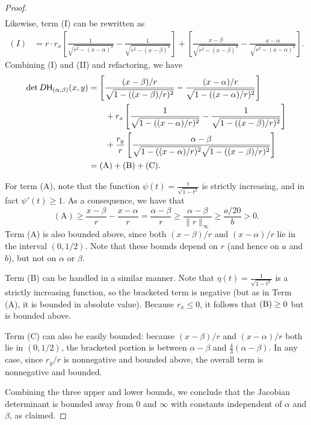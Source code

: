 \documentclass[10pt,a4paper]{amsart}
\begin{document}
\begin{proof}
\begin{align*}
    \end{align*}
    Likewise, term (I) can be rewritten as
    \begin{align*}
        (I) &= r \cdot r_x \left[\frac{1}{\sqrt{r^2 - (x - \alpha)^2}} - \frac{1}{\sqrt{r^2 - (x - \beta)^2}}\right] + \left[\frac{x - \beta}{\sqrt{r^2 - (x - \beta)^2}} - \frac{x - \alpha}{\sqrt{r^2 - (x - \alpha)^2}}\right].
    \end{align*}
    Combining (I) and (II) and refactoring, we have
    \begin{align*}
        \det D\mathsf{H}_{(\alpha, \beta)}(x, y) &= \left[\frac{(x - \beta) / r}{\sqrt{1 - ((x - \beta)/r)^2}} - \frac{(x - \alpha) / r}{\sqrt{1 - ((x - \alpha)/r)^2}} \right] \\
        &\quad\quad + r_x \left[\frac{1}{\sqrt{1 - ((x - \alpha) / r)^2}} - \frac{1}{\sqrt{1 - ((x - \beta)/r)^2}}\right] \\
        &\quad\quad + \frac{r_y}{r} \left[\frac{\alpha - \beta}{\sqrt{1 - ((x - \alpha)/r)^2} \sqrt{1 - ((x - \beta)/r)^2}}\right] \\
        &= (\text{A}) + (\text B) + (\text C).
    \end{align*}

For term (A), note that the function $\psi(t) = \frac{t}{\sqrt{1 - t^2}}$ is strictly increasing, and in fact $\psi'(t) \ge 1$. As a consequence, we have that
$$(\text{A}) \ge \frac{x - \beta}{r} - \frac{x - \alpha}{r} = \frac{\alpha - \beta}{r} \ge \frac{\alpha - \beta}{\|r\|_{\infty}} \ge \frac{a/20}{b} >  0.$$
Term (A) is also bounded above, since both $(x - \beta)/r$ and $(x - \alpha)/r$ lie in the interval $(0, 1/2)$. Note that these bounds depend on $r$ (and hence on $a$ and $b$), but not on $\alpha$ or $\beta$. 

Term (B) can be handled in a similar manner. Note that $\eta(t) = \frac{1}{\sqrt{1 - t^2}}$ is a strictly increasing function, so the bracketed term is negative (but as in Term (A), it is bounded in absolute value). Because $r_x \le 0$, it follows that $(\text B) \ge 0$ but is bounded above.

Term (C) can also be easily bounded: because $(x - \beta)/r$ and $(x - \alpha)/r$ both lie in $(0, 1/2)$, the bracketed portion is between $\alpha - \beta$ and $\frac 4 3 (\alpha - \beta)$. In any case, since $r_y/r$ is nonnegative and bounded above, the overall term is nonnegative and bounded. 

Combining the three upper and lower bounds, we conclude that the Jacobian determinant is bounded away from $0$ and $\infty$ with constants independent of $\alpha$ and $\beta$, as claimed. 
\end{proof}
\end{document}

